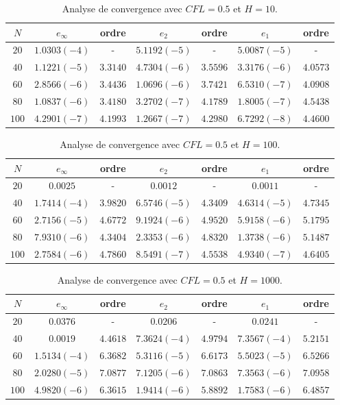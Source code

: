 \begin{table}%
\begin{tabular}{c|c|c|c|c|c|c}
$N$ & $e_{\infty}$ & ordre & $e_2$ & ordre & $e_1$ & ordre \\ 
\hline 
\hline
$20$ & $1.0303 (-4)$ & - & $5.1192 (-5)$ & - & $5.0087 (-5)$ & - \\ 
\hline 
$40$ & $1.1221 (-5)$ & $3.3140$ & $4.7304 (-6)$ & $3.5596$ & $3.3176 (-6)$ & $4.0573$ \\ 
\hline 
$60$ & $2.8566 (-6)$ & $3.4436$ & $1.0696 (-6)$ & $3.7421$ & $6.5310 (-7)$ & $4.0908$ \\
\hline 
$80$ & $1.0837 (-6)$ & $3.4180$ & $3.2702 (-7)$ & $4.1789$ & $1.8005 (-7)$ & $4.5438$ \\ 
\hline 
$100$ & $4.2901(-7)$ & $4.1993$ & $1.2667 (-7)$ & $4.2980$ & $6.7292 (-8)$ & $4.4600$  \\ 
\end{tabular} 
\caption{Analyse de convergence avec $CFL=0.5$ et $H=10$.}
\label{CV_order8_hp10}
\end{table}

\begin{table}%
\begin{tabular}{c|c|c|c|c|c|c}
$N$ & $e_{\infty}$ & ordre & $e_2$ & ordre & $e_1$ & ordre \\ 
\hline 
\hline
$20$ & $0.0025$ & - & $0.0012$ & - & $0.0011$ & - \\ 
\hline 
$40$ & $1.7414 (-4)$ & $3.9820$ & $6.5746 (-5)$ & $4.3409$ & $4.6314 (-5)$ & $4.7345$ \\ 
\hline 
$60$ & $2.7156 (-5)$ & $4.6772$ & $9.1924 (-6)$ & $4.9520$ & $5.9158 (-6)$ & $5.1795$ \\
\hline 
$80$ & $7.9310 (-6)$ & $4.3404$ & $2.3353 (-6)$ & $4.8320$ & $1.3738 (-6)$ & $5.1487$ \\ 
\hline 
$100$ & $2.7584(-6)$ & $4.7860$ & $8.5491 (-7)$ & $4.5538$ & $4.9340 (-7)$ & $4.6405$  \\ 
\end{tabular} 
\caption{Analyse de convergence avec $CFL=0.5$ et $H=100$.}
\label{CV_order8_hp100}
\end{table}

\begin{table}%
\begin{tabular}{c|c|c|c|c|c|c}
$N$ & $e_{\infty}$ & ordre & $e_2$ & ordre & $e_1$ & ordre \\ 
\hline 
\hline
$20$ & $0.0376$ & - & $0.0206$ & - & $0.0241$ & - \\ 
\hline 
$40$ & $0.0019$ & $4.4618$ & $7.3624 (-4)$ & $4.9794$ & $7.3567 (-4)$ & $5.2151$ \\ 
\hline 
$60$ & $1.5134 (-4)$ & $6.3682$ & $5.3116 (-5)$ & $6.6173$ & $5.5023 (-5)$ & $6.5266$ \\
\hline 
$80$ & $2.0280 (-5)$ & $7.0877$ & $7.1205 (-6)$ & $7.0863$ & $7.3563 (-6)$ & $7.0958$ \\ 
\hline 
$100$ & $4.9820(-6)$ & $6.3615$ & $1.9414 (-6)$ & $5.8892$ & $1.7583 (-6)$ & $6.4857$  \\ 
\end{tabular} 
\caption{Analyse de convergence avec $CFL=0.5$ et $H=1000$.}
\label{CV_order8_hp1000}
\end{table}


